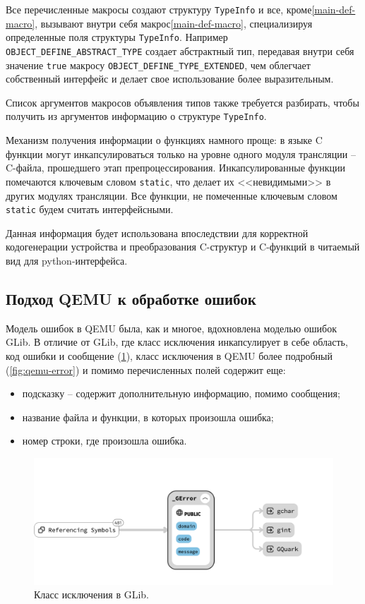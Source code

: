 Все перечисленные макросы создают структуру \texttt{TypeInfo} и все, кроме\cref{main-def-macro},
вызывают внутри себя макрос\cref{main-def-macro}, специализируя определенные поля структуры \texttt{TypeInfo}.
Например \texttt{OBJECT\_DEFINE\_ABSTRACT\_TYPE} создает абстрактный тип, передавая внутри себя
значение \texttt{true} макросу \texttt{OBJECT\_DEFINE\_TYPE\_EXTENDED}, чем облегчает собственный интерфейс
и делает свое использование более выразительным.

Список аргументов макросов объявления типов также требуется разбирать, чтобы получить из аргументов информацию
о структуре \texttt{TypeInfo}.

Механизм получения информации о функциях намного проще: в языке C функции могут инкапсулироваться
только на уровне одного модуля трансляции -- C-файла, прошедшего этап препроцессирования.
Инкапсулированные функции помечаются ключевым словом \texttt{static}, что делает их
<<невидимыми>> в других модулях трансляции.
Все функции, не помеченные ключевым словом \texttt{static} будем считать интерфейсными.

Данная информация будет использована впоследствии для корректной кодогенерации устройства
и преобразования C-структур и C-функций в читаемый вид для python-интерфейса.

\subsection{Подход QEMU к обработке ошибок}\label{sec:ch2/sec2/sub5/sub1}

Модель ошибок в QEMU была, как и многое, вдохновлена моделью ошибок GLib.
В отличие от GLib, где класс исключения инкапсулирует в себе область, код ошибки и сообщение (\cref{fig:glib-error}),
класс исключения в QEMU более подробный (\cref{fig:qemu-error}) и помимо перечисленных полей содержит еще:
\begin{itemize}
    \item подсказку -- содержит дополнительную информацию, помимо сообщения;
    \item название файла и функции, в которых произошла ошибка;
    \item номер строки, где произошла ошибка.
\end{itemize}

\begin{figure}[!htbp]
    \centering
    \begin{adjustbox}{max totalsize={0.8\textwidth}{\textheight}}
        \includegraphics[]{images/glib-error.png}
    \end{adjustbox}
    \caption{Класс исключения в GLib.}\label{fig:glib-error}
\end{figure}

